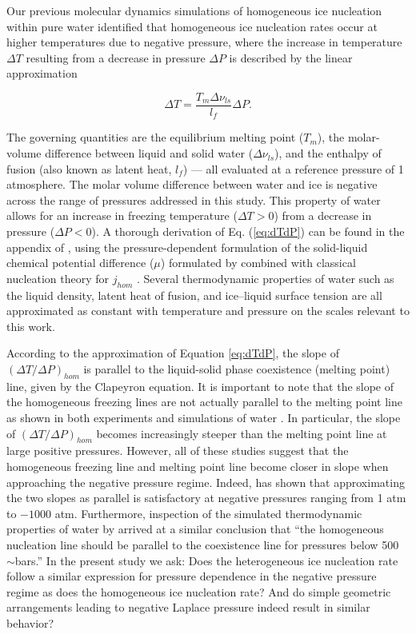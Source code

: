 \documentclass[journal abbreviation, manuscript]{copernicus}
\begin{document}
Our previous molecular dynamics simulations of homogeneous ice nucleation within pure water identified that homogeneous ice nucleation rates occur at higher temperatures due to negative pressure, where the increase in temperature $\Delta T$ resulting from a decrease in pressure $\Delta P$ is described by the linear approximation \citep{rosky2022}

\begin{equation} \label{eq:dTdP}
    \Delta T = \frac{T_m \Delta \nu_{ls}}{l_f} \Delta P.
\end{equation}

\noindent The governing quantities are the equilibrium melting point ($T_m$), the molar-volume difference between liquid and solid water ($\Delta \nu_{ls}$), and the enthalpy of fusion (also known as latent heat, $l_f$) --- all evaluated at a reference pressure of 1 atmosphere. The molar volume difference between water and ice is negative across the range of pressures addressed in this study. This property of water allows for an increase in freezing temperature ($\Delta T > 0$) from a decrease in pressure ($\Delta P < 0$). A thorough derivation of Eq. (\ref{eq:dTdP}) can be found in the appendix of \citet{rosky2022}, using the pressure-dependent formulation of the solid-liquid chemical potential difference ($\mu$) formulated by \citet{nemec2013} combined with classical nucleation theory for $j_{hom}$ \citep[see also][]{yang2018}. Several thermodynamic properties of water such as the liquid density, latent heat of fusion, and ice--liquid surface tension are all approximated as constant with temperature and pressure on the scales relevant to this work.

According to the approximation of Equation \ref{eq:dTdP}, the slope of $(\Delta T/\Delta P)_{hom}$ is parallel to the liquid-solid phase coexistence (melting point) line, given by the Clapeyron equation. It is important to note that the slope of the homogeneous freezing lines are not actually parallel to the melting point line as shown in both experiments and simulations of water  \citep{bianco2021, espinosa2016, kanno1975, lu2016anomaly, dhabal2022icewater}. In particular, the slope of $(\Delta T/\Delta P)_{hom}$ becomes increasingly steeper than the melting point line at large positive pressures. However, all of these studies suggest that the homogeneous freezing line and melting point line become closer in slope when approaching the negative pressure regime. Indeed, \citet{rosky2022} has shown that approximating the two slopes as parallel is satisfactory at negative pressures ranging from 1 atm to $-1000$ atm. Furthermore, inspection of the simulated thermodynamic properties of water by \citet{MonteroDeHijes2023} arrived at a similar conclusion that ``the homogeneous nucleation line should be parallel to the coexistence line for pressures below 500 $\sim$bars.'' In the present study we ask: Does the heterogeneous ice nucleation rate follow a similar expression for pressure dependence in the negative pressure regime as does the homogeneous ice nucleation rate? And do simple geometric arrangements leading to negative Laplace pressure indeed result in similar behavior?
\end{document}

